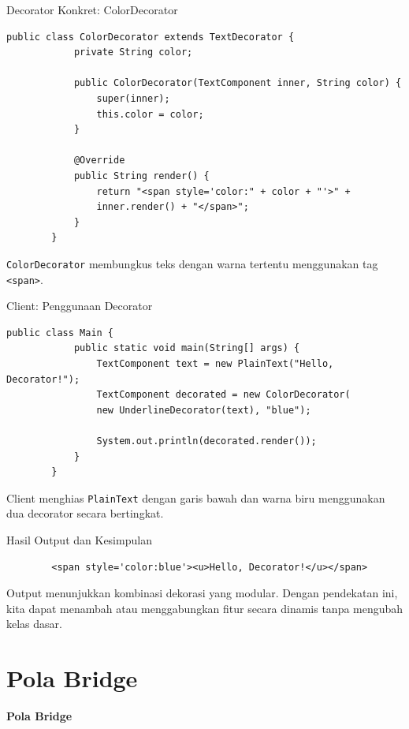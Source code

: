 \documentclass[aspectratio=169, table]{beamer}
\begin{document}
\begin{frame}[fragile]{Decorator Konkret: ColorDecorator}
	\vspace{20pt}
	\begin{lstlisting}[style=JavaStyle]
		public class ColorDecorator extends TextDecorator {
			private String color;
			
			public ColorDecorator(TextComponent inner, String color) {
				super(inner);
				this.color = color;
			}
			
			@Override
			public String render() {
				return "<span style='color:" + color + "'>" +
				inner.render() + "</span>";
			}
		}
	\end{lstlisting}
	\small
	\texttt{ColorDecorator} membungkus teks dengan warna tertentu menggunakan tag \texttt{<span>}.
\end{frame}

\begin{frame}[fragile]{Client: Penggunaan Decorator}
	\vspace{20pt}
	\begin{lstlisting}[style=JavaStyle]
		public class Main {
			public static void main(String[] args) {
				TextComponent text = new PlainText("Hello, Decorator!");
				TextComponent decorated = new ColorDecorator(
				new UnderlineDecorator(text), "blue");
				
				System.out.println(decorated.render());
			}
		}
	\end{lstlisting}
	\small
	Client menghias \texttt{PlainText} dengan garis bawah dan warna biru menggunakan dua decorator secara bertingkat.
\end{frame}

\begin{frame}[fragile]{Hasil Output dan Kesimpulan}
	\vspace{20pt}
	\begin{verbatim}
		<span style='color:blue'><u>Hello, Decorator!</u></span>
	\end{verbatim}
	\small
	Output menunjukkan kombinasi dekorasi yang modular. Dengan pendekatan ini, kita dapat menambah atau menggabungkan fitur secara dinamis tanpa mengubah kelas dasar.
\end{frame}

\section{Pola Bridge}

\begin{frame}{\hfill}
	\centering
	\textbf{\Huge{Pola Bridge}}
\end{frame}
\end{document}
